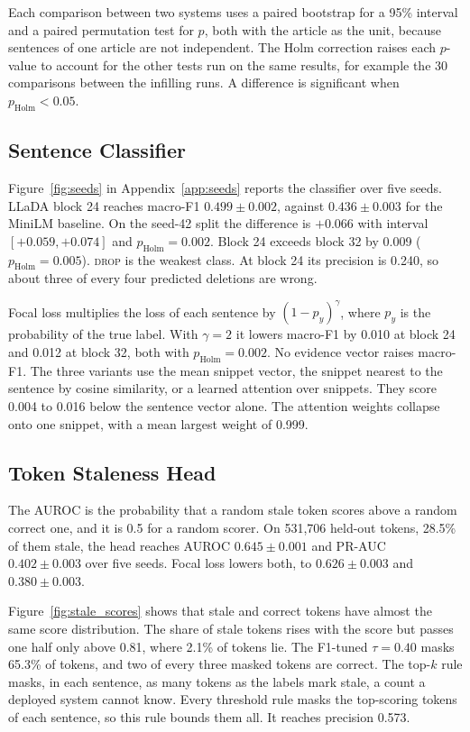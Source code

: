 \documentclass[11pt]{article}
\newcommand{\drop}{\textsc{drop}}
\begin{document}
    Each comparison between two systems uses a paired bootstrap \citep{efron-tibshirani-1993-bootstrap} for a 95\% interval and a paired permutation test for $p$, both with the article as the unit, because sentences of one article are not independent. The Holm correction \citep{holm-1979-simple} raises each $p$-value to account for the other tests run on the same results, for example the 30 comparisons between the infilling runs. A difference is significant when $p_{\text{Holm}} < 0.05$.

\subsection{Sentence Classifier}
    Figure~\ref{fig:seeds} in Appendix~\ref{app:seeds} reports the classifier over five seeds. LLaDA block 24 reaches macro-F1 $0.499 \pm 0.002$, against $0.436 \pm 0.003$ for the MiniLM baseline. On the seed-42 split the difference is $+0.066$ with interval $[+0.059, +0.074]$ and $p_{\text{Holm}} = 0.002$. Block 24 exceeds block 32 by 0.009 ($p_{\text{Holm}} = 0.005$). \drop{} is the weakest class. At block 24 its precision is 0.240, so about three of every four predicted deletions are wrong.

    Focal loss \citep{lin-etal-2017-focal} multiplies the loss of each sentence by $(1 - p_y)^{\gamma}$, where $p_y$ is the probability of the true label. With $\gamma = 2$ it lowers macro-F1 by 0.010 at block 24 and 0.012 at block 32, both with $p_{\text{Holm}} = 0.002$. No evidence vector raises macro-F1. The three variants use the mean snippet vector, the snippet nearest to the sentence by cosine similarity, or a learned attention over snippets. They score 0.004 to 0.016 below the sentence vector alone. The attention weights collapse onto one snippet, with a mean largest weight of 0.999.

\subsection{Token Staleness Head}
    The AUROC is the probability that a random stale token scores above a random correct one, and it is 0.5 for a random scorer. On 531,706 held-out tokens, 28.5\% of them stale, the head reaches AUROC $0.645 \pm 0.001$ and PR-AUC $0.402 \pm 0.003$ over five seeds. Focal loss lowers both, to $0.626 \pm 0.003$ and $0.380 \pm 0.003$.

    Figure~\ref{fig:stale_scores} shows that stale and correct tokens have almost the same score distribution. The share of stale tokens rises with the score but passes one half only above 0.81, where 2.1\% of tokens lie. The F1-tuned $\tau = 0.40$ masks 65.3\% of tokens, and two of every three masked tokens are correct. The top-$k$ rule masks, in each sentence, as many tokens as the labels mark stale, a count a deployed system cannot know. Every threshold rule masks the top-scoring tokens of each sentence, so this rule bounds them all. It reaches precision 0.573.
\end{document}
